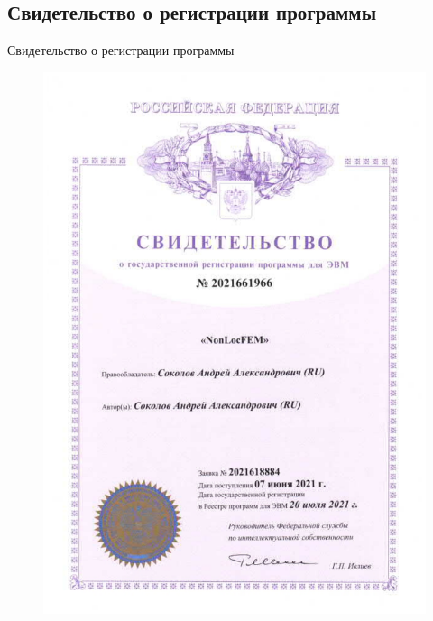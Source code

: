 \subsection{Свидетельство о регистрации программы}
\begin{frame}{Свидетельство о регистрации программы}
	\justifying
    \begin{figure}[h]
        \centering
        \includegraphics[height=0.65\textheight]{pics/Registration.pdf}

\end{figure}
\end{frame}

